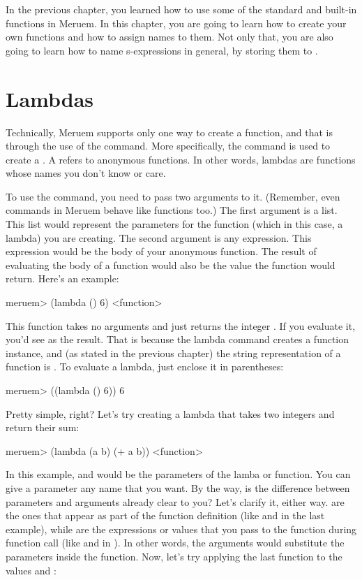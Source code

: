 In the previous chapter, you learned how to use some of the standard and built-in functions in Meruem. In this chapter, you are going to learn how to create your own functions and how to assign names to them. Not only that, you are also going to learn how to name s-expressions in general, by storing them to .

\section{Lambdas}
Technically, Meruem supports only one way to create a function, and that is through the use of the  command. More specifically, the  command is used to create a . A  refers to anonymous functions. In other words, lambdas are functions whose names you don't know or care. 

To use the  command, you need to pass two arguments to it. (Remember, even commands in Meruem behave like functions too.) The first argument is a list. This list would represent the parameters for the function (which in this case, a lambda) you are creating. The second argument is any expression. This expression would be the body of your anonymous function. The result of evaluating the body of a function would also be the value the function would return. Here's an example:

\begin{REPL}
meruem> (lambda () 6)
<function>
\end{REPL}

This function takes no arguments and just returns the integer . If you evaluate it, you'd see  as the result. That is because the lambda command creates a function instance, and (as stated in the previous chapter) the string representation of a function is . To evaluate a lambda, just enclose it in parentheses:

\begin{REPL}
meruem> ((lambda () 6))
6
\end{REPL}

Pretty simple, right? Let's try creating a lambda that takes two integers and return their sum:

\begin{REPL}
meruem> (lambda (a b) (+ a b)) 
<function>
\end{REPL}

In this example,  and  would be the parameters of the lamba or function. You can give a parameter any name that you want. By the way, is the difference between parameters and arguments already clear to you? Let's clarify it, either way.  are the ones that appear as part of the function definition (like  and  in the last example), while  are the expressions or values that you pass to the function during function call (like  and  in ). In other words, the arguments would substitute the parameters inside the function. Now, let's try applying the last function to the values  and :

